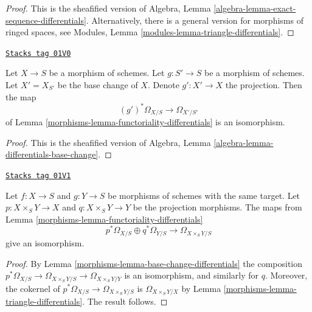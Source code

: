 \begin{proof}
This is the sheafified version of
Algebra, Lemma \ref{algebra-lemma-exact-sequence-differentials}.
Alternatively, there is a general version for morphisms of ringed
spaces, see Modules, Lemma \ref{modules-lemma-triangle-differentials}.
\end{proof}

\begin{lemma}
\label{morphisms-lemma-base-change-differentials}
\href{https://stacks.math.columbia.edu/tag/01V0}{\texttt{Stacks tag 01V0}}

Let $X \to S$ be a morphism of schemes.
Let $g : S' \to S$ be a morphism of schemes.
Let $X' = X_{S'}$ be the base change of $X$.
Denote $g' : X' \to X$ the projection.
Then the map
$$
(g')^*\Omega_{X/S} \to \Omega_{X'/S'}
$$
of Lemma \ref{morphisms-lemma-functoriality-differentials} is an isomorphism.
\end{lemma}

\begin{proof}
This is the sheafified version of
Algebra, Lemma \ref{algebra-lemma-differentials-base-change}.
\end{proof}

\begin{lemma}
\label{morphisms-lemma-differential-product}
\href{https://stacks.math.columbia.edu/tag/01V1}{\texttt{Stacks tag 01V1}}

Let $f : X \to S$ and $g : Y \to S$ be morphisms of schemes with the same
target. Let $p : X \times_S Y \to X$ and $q : X \times_S Y \to Y$ be the
projection morphisms. The maps from
Lemma \ref{morphisms-lemma-functoriality-differentials}
$$
p^*\Omega_{X/S} \oplus q^*\Omega_{Y/S}
\longrightarrow
\Omega_{X \times_S Y/S}
$$
give an isomorphism.
\end{lemma}

\begin{proof}

By Lemma \ref{morphisms-lemma-base-change-differentials} the composition
$p^*\Omega_{X/S} \to \Omega_{X \times_S Y/S} \to \Omega_{X \times_S Y/Y}$
is an isomorphism, and similarly for $q$. Moreover, the cokernel
of $p^*\Omega_{X/S} \to \Omega_{X \times_S Y/S}$ is
$\Omega_{X \times_S Y/X}$ by
Lemma \ref{morphisms-lemma-triangle-differentials}. The result follows.
\end{proof}

